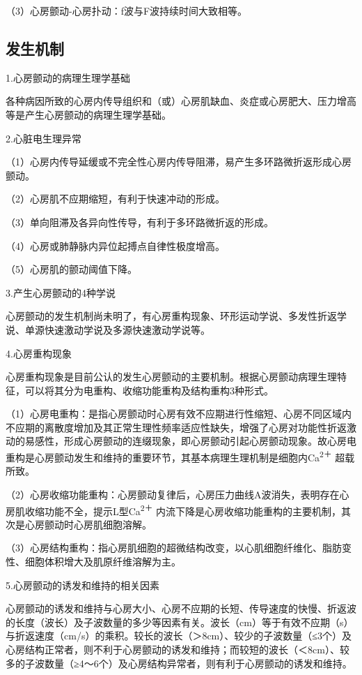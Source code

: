 （3）心房颤动-心房扑动：f波与F波持续时间大致相等。

\protect\hypertarget{text00020.htmlux5cux23subid202}{}{}

\subsection{发生机制}

1.心房颤动的病理生理学基础

各种病因所致的心房内传导组织和（或）心房肌缺血、炎症或心房肥大、压力增高等是产生心房颤动的病理生理学基础。

2.心脏电生理异常

（1）心房内传导延缓或不完全性心房内传导阻滞，易产生多环路微折返形成心房颤动。

（2）心房肌不应期缩短，有利于快速冲动的形成。

（3）单向阻滞及各异向性传导，有利于多环路微折返的形成。

（4）心房或肺静脉内异位起搏点自律性极度增高。

（5）心房肌的颤动阈值下降。

3.产生心房颤动的4种学说

心房颤动的发生机制尚未明了，有心房重构现象、环形运动学说、多发性折返学说、单源快速激动学说及多源快速激动学说等。

4.心房重构现象

心房重构现象是目前公认的发生心房颤动的主要机制。根据心房颤动病理生理特征，可以将其分为电重构、收缩功能重构及结构重构3种形式。

（1）心房电重构：是指心房颤动时心房有效不应期进行性缩短、心房不同区域内不应期的离散度增加及其正常生理性频率适应性缺失，增强了心房对功能性折返激动的易感性，形成心房颤动的连缀现象，即心房颤动引起心房颤动现象。故心房电重构是心房颤动发生和维持的重要环节，其基本病理生理机制是细胞内Ca\textsuperscript{2＋}
超载所致。

（2）心房收缩功能重构：心房颤动复律后，心房压力曲线A波消失，表明存在心房肌收缩功能不全，提示L型Ca\textsuperscript{2＋}
内流下降是心房收缩功能重构的主要机制，其次是心房颤动时心房肌细胞溶解。

（3）心房结构重构：指心房肌细胞的超微结构改变，以心肌细胞纤维化、脂肪变性、细胞体积增大及肌原纤维溶解为主。

5.心房颤动的诱发和维持的相关因素

心房颤动的诱发和维持与心房大小、心房不应期的长短、传导速度的快慢、折返波的长度（波长）及子波数量的多少等因素有关。波长（cm）等于有效不应期（s）与折返速度（cm/s）的乘积。较长的波长（＞8cm）、较少的子波数量（≤3个）及心房结构正常者，则不利于心房颤动的诱发和维持；而较短的波长（＜8cm）、较多的子波数量（≥4～6个）及心房结构异常者，则有利于心房颤动的诱发和维持。

